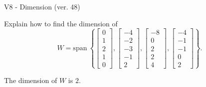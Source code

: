 \begin{exercise}
  \begin{exerciseTitle}V8 - Dimension (ver. 48)\end{exerciseTitle}
  \begin{exerciseStatement}
    Explain how to find the dimension of 
\[W=\mathrm{span}\ \left\{\left[\begin{array}{r}
0 \\
1 \\
2 \\
1 \\
0
\end{array}\right] , \left[\begin{array}{r}
-4 \\
-2 \\
-3 \\
-1 \\
2
\end{array}\right] , \left[\begin{array}{r}
-8 \\
0 \\
2 \\
2 \\
4
\end{array}\right] , \left[\begin{array}{r}
-4 \\
-1 \\
-1 \\
0 \\
2
\end{array}\right]\right\}.\]



  \end{exerciseStatement}
  \begin{exerciseAnswer}
   The dimension of \(W\) is  \(2\).
  


  \end{exerciseAnswer}
\end{exercise}